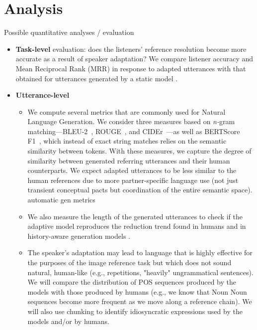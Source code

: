 
\section{Analysis}
\label{sec:analysis}
Possible quantitative analyses / evaluation
\begin{itemize}
\item \textbf{Task-level }evaluation: does the listeners' reference resolution become more accurate as a result of speaker adaptation? We compare listener accuracy and Mean Reciprocal Rank (MRR) in response to adapted utterances with that obtained for utterances generated by a static model \cite{takmaz-etal-2020-refer}.
\item \textbf{Utterance-level}
	\begin{itemize}
	\item We compute several metrics that are commonly used for Natural Language Generation. We consider three measures based on \emph{n-}gram matching---BLEU-2~\cite{Papineni:2002},
ROUGE~\cite{Lin2004}, and CIDEr~\cite{cider}---as well as BERTScore F1~\cite{bert-score}, which instead of exact string matches relies on the semantic similarity between tokens. With these measures, we capture the degree of similarity between generated referring utterances and their human counterparts. We expect adapted utterances to be less similar to the human references due to more partner-specific language use (not just transient conceptual pacts but coordination of the entire semantic space).
automatic gen metrics
	\item We also measure the length of the generated utterances to check if the adaptive model reproduces the reduction trend found in humans \cite{haber2019photobook,hawkins2020continual} and in history-aware generation models \cite{takmaz-etal-2020-refer,hawkins2020characterizing}.
	\item The speaker's adaptation may lead to language that is highly effective for the purposes of the image reference task but which does not sound natural, human-like (e.g., repetitions, "heavily" ungrammatical sentences). We will compare the distribution of POS sequences produced by the models with those produced by humans (e.g., we know that Noun Noun sequences become more frequent as we move along a reference chain). We will also use chunking to identify idiosyncratic expressions used by the models and/or by humans.

\end{itemize}
\end{itemize}
